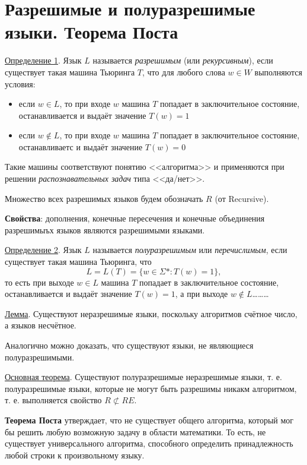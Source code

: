 \section{Разрешимые и полуразрешимые языки. Теорема Поста}

\underline{Определение 1}. Язык $L$ называется \textit{разрешимым} (или \textit{рекурсивным}), если существует такая машина Тьюринга $T$, что для любого слова $w \in W$ выполняются условия:
\begin{itemize}
    \item если $w \in L$, то при входе $w$ машина $T$ попадает в заключительное состояние, останавливается и выдаёт значение $T(w) = 1$
    \item если $w \not \in L$, то при входе $w$ машина $T$ попадает в заключительное состояние, останавливаетс и выдаёт значение $T(w) = 0$
\end{itemize}

Такие машины соответствуют понятию <<алгоритма>> и применяются при решении \textit{распознавательных задач} типа <<да/нет>>.

Множество всех разрешимых языков будем обозначать $R$ (от Recursive).

\textbf{Свойства}: дополнения, конечные пересечения и конечные объединения разрешимыъх языков являются разрешимыми языками.

\underline{Определение 2}. Язык $L$ называется \textit{полуразрешимым} или \textit{перечислимым}, если существует такая машина Тьюринга, что
\begin{equation}
    L = L(T) = \{w \in \Sigma* : T(w) = 1\},
\end{equation}
то есть при выходе $w \in L$ машина $T$ попадает в заключительное состояние, останавливается и выдаёт значение $T(w) = 1$, а при выходе $w \not \in L$\dots\dots\dots

\underline{Лемма}. Существуют неразрешимые языки, поскольку алгоритмов счётное число, а языков несчётное.

Аналогично можно доказать, что существуют языки, не являющиеся полуразрешимыми.

\underline{Основная теорема}. Существуют полуразрешимые неразрешимые языки, т. е. полуразрешимые языки, которые не могут быть разрешимы никакм алгоритмом, т. е. выполняется свойство $R \not \subset RE$.

\textbf{Теорема Поста} утверждает, что не существует общего алгоритма, который мог бы решить любую возможную задачу в области математики. То есть, не существует универсального алгоритма, способного определить принадлежность любой строки к произвольному языку.